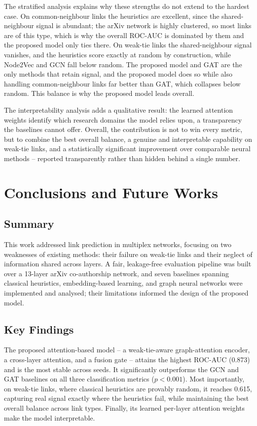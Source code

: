 \documentclass[11pt,a4paper]{article}
\begin{document}
The stratified analysis explains why these strengths do not extend to the hardest case. On
common-neighbour links the heuristics are excellent, since the shared-neighbour signal is abundant;
the arXiv network is highly clustered, so most links are of this type, which is why the overall
ROC-AUC is dominated by them and the proposed model only ties there. On weak-tie links the
shared-neighbour signal vanishes, and the heuristics score exactly at random by construction, while
Node2Vec and GCN fall below random. The proposed model and GAT are the only methods that retain
signal, and the proposed model does so while also handling common-neighbour links far better than
GAT, which collapses below random. This balance is why the proposed model leads overall.

The interpretability analysis adds a qualitative result: the learned attention weights identify which
research domains the model relies upon, a transparency the baselines cannot offer. Overall, the
contribution is not to win every metric, but to combine the best overall balance, a genuine and
interpretable capability on weak-tie links, and a statistically significant improvement over
comparable neural methods -- reported transparently rather than hidden behind a single number.

\section{Conclusions and Future Works}

\subsection{Summary}
This work addressed link prediction in multiplex networks, focusing on two weaknesses of existing
methods: their failure on weak-tie links and their neglect of information shared across layers. A
fair, leakage-free evaluation pipeline was built over a 13-layer arXiv co-authorship network, and
seven baselines spanning classical heuristics, embedding-based learning, and graph neural networks
were implemented and analysed; their limitations informed the design of the proposed model.

\subsection{Key Findings}
The proposed attention-based model -- a weak-tie-aware graph-attention encoder, a cross-layer
attention, and a fusion gate -- attains the highest ROC-AUC (0.873) and is the most stable across
seeds. It significantly outperforms the GCN and GAT baselines on all three classification metrics
($p<0.001$). Most importantly, on weak-tie links, where classical heuristics are provably random, it
reaches 0.615, capturing real signal exactly where the heuristics fail, while maintaining the best
overall balance across link types. Finally, its learned per-layer attention weights make the model
interpretable.
\end{document}
